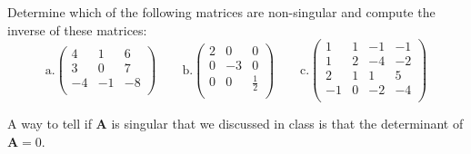 \documentclass[12pts]{exam}
\newcommand{\ve}[1]{\ensuremath{\mathbf{#1}}}
\begin{document}
\begin{questions}
\newpage
\addpoints
\question[15] 
Determine which of the following matrices are non-singular and compute the inverse of these matrices:
\newcommand{\aaa}{4}
\newcommand{\aab}{1}
\newcommand{\aac}{6}
\newcommand{\aba}{3}
\newcommand{\abb}{0}
\newcommand{\abc}{7}
\newcommand{\aca}{-4}
\newcommand{\acb}{-1}
\newcommand{\acc}{-8}
\newcommand{\baa}{2}
\newcommand{\bab}{0}
\newcommand{\bac}{0}
\newcommand{\bba}{0}
\newcommand{\bbb}{-3}
\newcommand{\bbc}{0}
\newcommand{\bca}{0}
\newcommand{\bcb}{0}
\newcommand{\bcc}{\frac{1}{2}}
\newcommand{\caa}{1}
\newcommand{\cab}{1}
\newcommand{\cac}{-1}
\newcommand{\cad}{-1}
\newcommand{\cba}{1}
\newcommand{\cbb}{2}
\newcommand{\cbc}{-4}
\newcommand{\cbd}{-2}
\newcommand{\cca}{2}
\newcommand{\ccb}{1}
\newcommand{\ccc}{1}
\newcommand{\ccd}{5}
\newcommand{\cda}{-1}
\newcommand{\cdb}{0}
\newcommand{\cdc}{-2}
\newcommand{\cdd}{-4}
\begin{equation}
\text{a.} \begin{pmatrix}
   \aaa & \aab & \aac \\
   \aba & \abb & \abc \\
   \aca & \acb & \acc \\
\end{pmatrix} \qquad
%
\text{b.} \begin{pmatrix}
   \baa & \bab & \bac \\
   \bba & \bbb & \bbc \\
   \bca & \bcb & \bcc \\
\end{pmatrix} \qquad
%
\text{c.} \begin{pmatrix}
  \caa & \cab & \cac & \cad \\
  \cba & \cbb & \cbc & \cbd \\
  \cca & \ccb & \ccc & \ccd \\
  \cda & \cdb & \cdc & \cdd \\
\end{pmatrix} \nonumber
\end{equation}

\begin{solution}
A way to tell if $\ve{A}$ is singular that we discussed in class is that the determinant of $\ve{A}=0$.

\begin{parts}

\end{parts}
\end{solution}
\end{questions}
\end{document}
